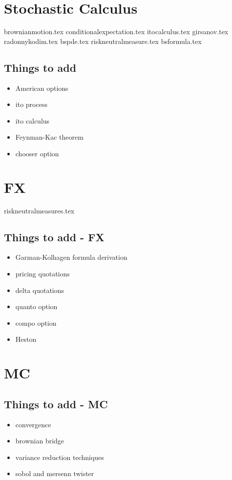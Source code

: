 \documentclass{article}
\begin{document}
	
\section{Stochastic Calculus}

{brownianmotion.tex}
{conditionalexpectation.tex}
{itocalculus.tex}
{girsanov.tex}
{radonnykodim.tex}
{bspde.tex}
{riskneutralmeasure.tex}
{bsformula.tex}


\subsection{Things to add}
\begin{itemize}
	\item American options
	\item ito process
	\item ito calculus
	\item Feynman-Kac theorem
	\item chooser option
\end{itemize}


\section{FX}

{riskneutralmeasures.tex}

\subsection{Things to add - FX}
\begin{itemize}
	\item Garman-Kolhagen formula derivation
	\item pricing quotations
	\item delta quotations
	\item quanto option
	\item compo option
	\item Heston
\end{itemize}


\section{MC}

\subsection{Things to add - MC}
\begin{itemize}
	\item convergence
	\item brownian bridge
	\item variance reduction techniques
	\item sobol and mersenn twister
\end{itemize}
\end{document}
